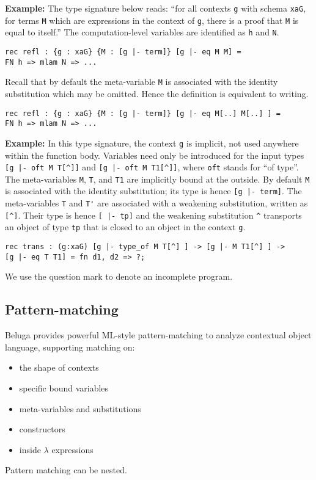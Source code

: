 \documentclass[11pt]{article}
\begin{document}
\textbf{Example:} The type signature below reads: ``for all contexts
\texttt{g} with schema \texttt{xaG}, for terms \texttt{M} which are
expressions in the context of \texttt{g}, there is a proof that
\texttt{M} is equal to itself.'' The computation-level variables are
identified as \texttt{h} and \texttt{N}.

\begin{verbatim}
rec refl : {g : xaG} {M : [g |- term]} [g |- eq M M] =
FN h => mlam N => ...
\end{verbatim}

Recall that by default
the meta-variable \verb+M+ is associated with the identity
substitution which may be omitted. Hence the definition is equivalent to writing.


\begin{verbatim}
rec refl : {g : xaG} {M : [g |- term]} [g |- eq M[..] M[..] ] =
FN h => mlam N => ...
\end{verbatim}



\textbf{Example:} In this type signature, the context \texttt{g} is
implicit, not used anywhere within the function body. Variables need
only be introduced for the input types \verb+[g |- oft M T[^]]+ and
\verb+[g |- oft M T1[^]]+, where \texttt{oft} stands for ``of
type''. The meta-variables \texttt{M}, \texttt{T}, and \texttt{T1} are implicitly
bound at the outside. By default \verb+M+ is associated with the
identity substitution; its type is hence \verb+[g |- term]+. The
meta-variables \verb+T+ and \verb+T'+ are associated with a weakening
substitution, written as \verb+[^]+. Their type is hence
 \verb+[ |- tp]+ and the weakening substitution \verb+^+ transports an
 object of type \verb+tp+ that is closed to an object in the context \verb+g+.

\begin{verbatim}
rec trans : (g:xaG) [g |- type_of M T[^] ] -> [g |- M T1[^] ] ->
[g |- eq T T1] = fn d1, d2 => ?;
\end{verbatim}

We use the question mark to denote an incomplete program.

\subsection{Pattern-matching}
Beluga provides powerful ML-style pattern-matching to analyze contextual object language, supporting matching on:
\begin{itemize}
\item the shape of contexts
\item specific bound variables
\item meta-variables and substitutions
\item constructors
\item inside $\lambda$ expressions
\end{itemize}
Pattern matching can be nested.
\end{document}
